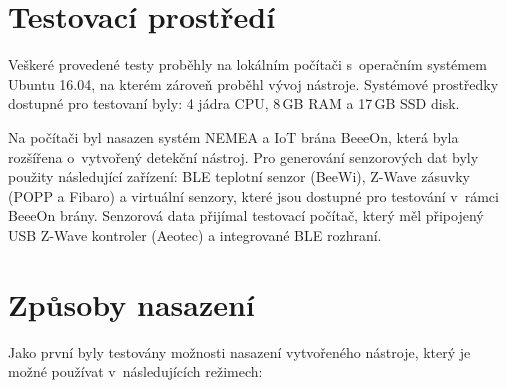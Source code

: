 
\section{Testovací prostředí}
Veškeré provedené testy proběhly na lokálním počítači s~operačním systémem Ubuntu 16.04,
na kterém zároveň proběhl vývoj nástroje. Systémové
prostředky dostupné pro testovaní byly: 4 jádra CPU, 8\,GB RAM a 17\,GB SSD disk.

Na počítači byl nasazen systém NEMEA a IoT brána BeeeOn, která byla rozšířena o~vytvořený detekční 
nástroj. Pro generování senzorových dat byly použity následující zařízení: BLE teplotní senzor (BeeWi), 
Z-Wave zásuvky (POPP a Fibaro) a virtuální senzory, které jsou dostupné pro testování
v~rámci BeeeOn brány.
Senzorová data přijímal testovací počítač, který měl připojený USB Z-Wave kontroler (Aeotec) a integrované
BLE rozhraní.

\section{Způsoby nasazení}
Jako první byly testovány možnosti nasazení vytvořeného nástroje, který je možné používat
v~následujících režimech:

